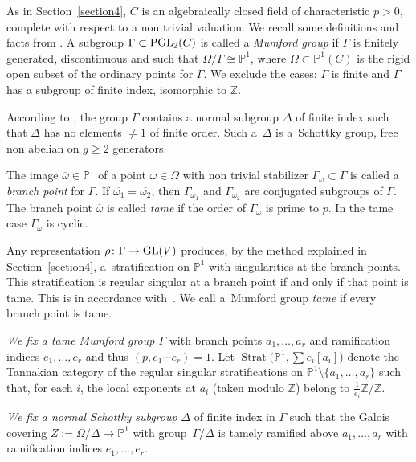\documentclass[pdftex]{sigma}
\numberwithin{equation}{section}
\begin{document}
As in Section~\ref{section4}, $C$ is an algebraically closed field of characteristic $p>0$, complete with respect to a non trivial valuation. We recall some definitions and facts from \cite[Section~9]{Vo-vdP}. A subgroup $\Gamma \subset {\rm PGL}_2(C)$ is called a {\it Mumford group} if $\Gamma$ is finitely generated, discontinuous and such that $\Omega /\Gamma\cong \mathbb{P}^1$, where $\Omega \subset \mathbb{P}^1(C)$ is the rigid open subset of the ordinary points for $\Gamma$. We exclude the cases: $\Gamma$ is finite and $\Gamma$ has a subgroup of finite index, isomorphic to $\mathbb{Z}$.

According to \cite[Theorem I.3.1]{Ge-vdP}, the group $\Gamma$ contains a normal subgroup $\Delta$ of finite index such that $\Delta$ has no elements $\neq 1$ of finite order. Such a~$\Delta$ is a~Schottky group, free non abelian on $g \geq 2$ generators.

The image $\overline{\omega}\in \mathbb{P}^1$ of a point $\omega \in \Omega$ with non trivial stabilizer $\Gamma_\omega\subset \Gamma$ is called a {\it branch point} for $\Gamma$. If $\overline{\omega _1}=\overline{\omega_2}$, then $\Gamma_{\omega_1}$ and $\Gamma_{\omega_2}$ are conjugated subgroups of $\Gamma$. The branch point $\overline{\omega}$ is called {\it tame} if the order of $\Gamma_\omega$ is prime to $p$. In the tame case $\Gamma_\omega$ is cyclic.

Any representation $\rho\colon \Gamma \rightarrow {\rm GL}(V)$ produces, by the method explained in Section~\ref{section4}, a~stra\-ti\-fication on $\mathbb{P}^1$ with singularities at the branch points. This stratification is regular singular at a branch point if and only if that point is tame. This is in accordance with~\cite{Ki}. We call a~Mumford group {\it tame} if every branch point is tame.

{\it We fix a tame Mumford group $\Gamma$} with branch points $a_1,\dots ,a_r$ and ramification indices $e_1,\dots ,e_r$ and thus $(p, e_1\cdots e_r)=1$. Let $\operatorname{Strat}\big(\mathbb{P}^1,\sum e_i[a_i]\big)$ denote the Tannakian category of the regular singular stratifications on $\mathbb{P}^1\setminus \{a_1,\dots ,a_r\}$ such that, for each $i$, the local exponents at $a_i$ (taken modulo $\mathbb{Z}$) belong to $\frac{1}{e_i}\mathbb{Z}/\mathbb{Z}$.

{\it We fix a normal Schottky subgroup} $\Delta$ of finite index in $\Gamma$ such that the Galois covering $Z:=\Omega/ \Delta \rightarrow \mathbb{P}^1$ with group~$\Gamma/\Delta$ is tamely ramified above $a_1,\dots ,a_r$ with ramification indices $e_1,\dots ,e_r$.
\end{document}
